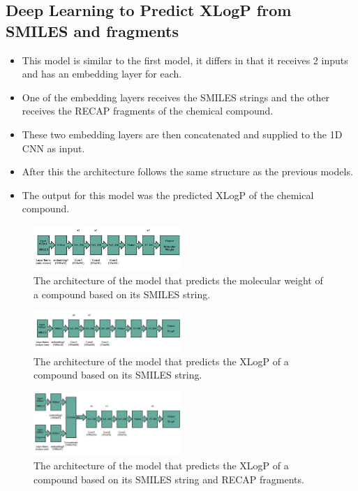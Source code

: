     \subsection{Deep Learning to Predict XLogP from SMILES and fragments}
        \begin{itemize}
            \item This model is similar to the first model, it differs in that it receives 2 inputs and has an embedding layer for each. 
            \item One of the embedding layers receives the SMILES strings and the other receives the RECAP fragments of the chemical compound.
            \item These two embedding layers are then concatenated and supplied to the 1D CNN as input.
            \item After this the architecture follows the same structure as the previous models.
            \item The output for this model was the predicted XLogP of the chemical compound.
        \end{itemize}
    
    \begin{figure}
        \centering
        \includegraphics[width=0.5\textwidth]{figures/MW-model_arquitecture.jpg}
        \caption{The architecture of the model that predicts the molecular weight of a compound based on its SMILES string.}
        \label{fig:mw-architecture}
    \end{figure}
    \begin{figure}
        \centering
        \includegraphics[width=0.5\textwidth]{figures/XLogP-model_arquitecture.jpg}
        \caption{The architecture of the model that predicts the XLogP of a compound based on its SMILES string.}
        \label{fig:xlogp-archi1}
    \end{figure}
    \begin{figure}
        \centering
        \includegraphics[width=0.5\textwidth]{figures/XLogP_frag_model_arquitecture.jpg}
        \caption{The architecture of the model that predicts the XLogP of a compound based on its SMILES string and RECAP fragments.}
        \label{fig:model23-mol-weight-loss}
    \end{figure}